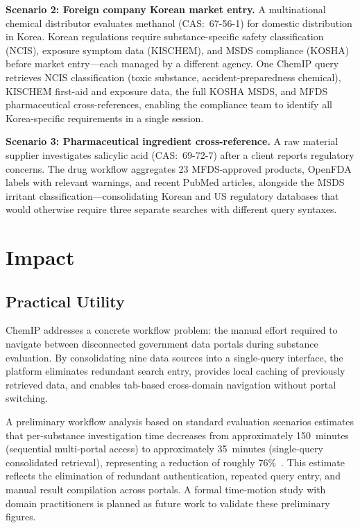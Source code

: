 \documentclass[preprint,12pt]{elsarticle}
\begin{document}
\textbf{Scenario 2: Foreign company Korean market entry.}
A multinational chemical distributor evaluates methanol (CAS:~67-56-1) for domestic distribution in Korea.
Korean regulations require substance-specific safety classification (NCIS), exposure symptom data (KISCHEM), and MSDS compliance (KOSHA) before market entry---each managed by a different agency.
One ChemIP query retrieves NCIS classification (toxic substance, accident-preparedness chemical), KISCHEM first-aid and exposure data, the full KOSHA MSDS, and MFDS pharmaceutical cross-references, enabling the compliance team to identify all Korea-specific requirements in a single session.

\textbf{Scenario 3: Pharmaceutical ingredient cross-reference.}
A raw material supplier investigates salicylic acid (CAS:~69-72-7) after a client reports regulatory concerns.
The drug workflow aggregates 23 MFDS-approved products, OpenFDA labels with relevant warnings, and recent PubMed articles, alongside the MSDS irritant classification---consolidating Korean and US regulatory databases that would otherwise require three separate searches with different query syntaxes.

\section{Impact}
\label{sec:impact}

\subsection{Practical Utility}

ChemIP addresses a concrete workflow problem: the manual effort required to navigate between disconnected government data portals during substance evaluation.
By consolidating nine data sources into a single-query interface, the platform eliminates redundant search entry, provides local caching of previously retrieved data, and enables tab-based cross-domain navigation without portal switching.

A preliminary workflow analysis based on standard evaluation scenarios estimates that per-substance investigation time decreases from approximately 150~minutes (sequential multi-portal access) to approximately 35~minutes (single-query consolidated retrieval), representing a reduction of roughly 76\%~\cite{api_adoption_playbook}.
This estimate reflects the elimination of redundant authentication, repeated query entry, and manual result compilation across portals.
A formal time-motion study with domain practitioners is planned as future work to validate these preliminary figures.
\end{document}

